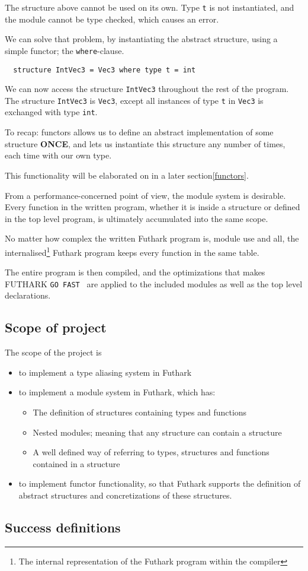 The structure above cannot be used on its own. Type \texttt{t} is not
instantiated, and the module cannot be type checked, which causes an error.

We can solve that problem, by instantiating the abstract structure, using a
simple functor; the \texttt{where}-clause.
\begin{verbatim}
  structure IntVec3 = Vec3 where type t = int
\end{verbatim}
We can now access the structure \texttt{IntVec3} throughout the rest of the
program. The structure \texttt{IntVec3} is \texttt{Vec3}, except all instances
of type \texttt{t} in \texttt{Vec3} is exchanged with type \texttt{int}.

To recap: functors allows us to define an abstract implementation of some
structure \textbf{ONCE}, and lets us instantiate this structure any number of
times, each time with our own type.

This functionality will be elaborated on in a later section\ref{functors}. 

From a performance-concerned point of view, the module system is desirable.
Every function in the written program, whether it is inside a structure
or defined in the top level program, is ultimately accumulated into the same
scope.

No matter how complex the written Futhark program is, module use and all, the
internalised\footnote[]{The internal representation of the Futhark program
  within the compiler} Futhark program keeps every function in the same table.

The entire program is then compiled, and the optimizations that makes FUTHARK \texttt{GO
FAST } are applied to the included modules as well as the top level declarations.

\subsection{Scope of project}
\label{subsec:project_scope}
The scope of the project is
\begin{itemize}
  \item to implement a type aliasing system in Futhark
  \item to implement a module system in Futhark, which has:
    \begin{itemize}
      \item The definition of structures containing types and functions
      \item Nested modules; meaning that any structure can contain a structure
      \item A well defined way of referring to types, structures and functions
        contained in a structure
    \end{itemize}
  \item to implement functor functionality, so that Futhark supports the
    definition of abstract structures and concretizations of these structures.
\end{itemize}

\subsection{Success definitions}
\label{subsec:label}


